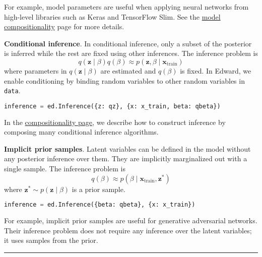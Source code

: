 For example, model parameters are useful when applying neural networks
from high-level libraries such as Keras and TensorFlow Slim. See
the \href{/api/model-compositionality}{model compositionality} page
for more details.

\textbf{Conditional inference}.
In conditional inference, only a subset of the posterior is inferred
while the rest are fixed using other inferences. The inference
problem is
\begin{equation*}
q(\mathbf{z}\mid\beta)q(\beta)\approx
p(\mathbf{z}, \beta\mid\mathbf{x}_{\text{train}})
\end{equation*}
where parameters in $q(\mathbf{z}\mid\beta)$ are estimated and
$q(\beta)$ is fixed.
%
In Edward, we enable conditioning by binding random variables to other
random variables in \texttt{data}.
\begin{lstlisting}[language=Python]
inference = ed.Inference({z: qz}, {x: x_train, beta: qbeta})
\end{lstlisting}

In the \href{/api/inference-compositionality}{compositionality page},
we describe how to construct inference by composing
many conditional inference algorithms.

\textbf{Implicit prior samples}.
Latent variables can be defined in the model without any posterior
inference over them. They are implicitly marginalized out with a
single sample. The inference problem is
\begin{equation*}
q(\beta)\approx
p(\beta\mid\mathbf{x}_{\text{train}}, \mathbf{z}^*)
\end{equation*}
where $\mathbf{z}^*\sim p(\mathbf{z}\mid\beta)$ is a prior sample.

\begin{lstlisting}[language=Python]
inference = ed.Inference({beta: qbeta}, {x: x_train})
\end{lstlisting}

For example, implicit prior samples are useful for generative adversarial
networks. Their inference problem does not require any inference over
the latent variables; it uses samples from the prior.

\begin{center}\rule{3in}{0.4pt}\end{center}

